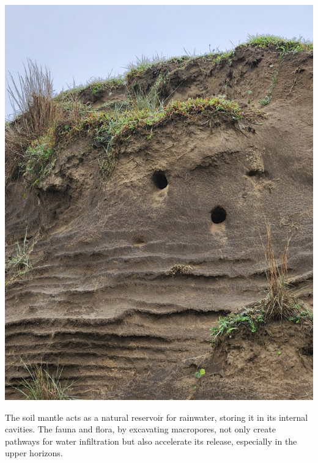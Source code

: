 \documentclass[./main_en.tex]{subfiles}
\begin{document}
\nolinenumbers

\newpage
\renewcommand{\headrulewidth}{0pt}
\thispagestyle{fancy}
\fancyhf{} %
\fancyfoot{} %
\fancyfoot[C]{\thepage}

\par \hfill
\vspace{40mm}
\begin{adjustwidth}{45pt}{45pt}
\begin{center}
    \includegraphics[scale=0.7]{figs/fig_tucos.jpg}\\
\end{center}
\vspace{10mm}
\noindent \textsf{The soil mantle acts as a natural reservoir for rainwater, storing it in its internal cavities. The fauna and flora, by excavating macropores, not only create pathways for water infiltration but also accelerate its release, especially in the upper horizons.}
\end{adjustwidth}
\clearpage
\end{document}

